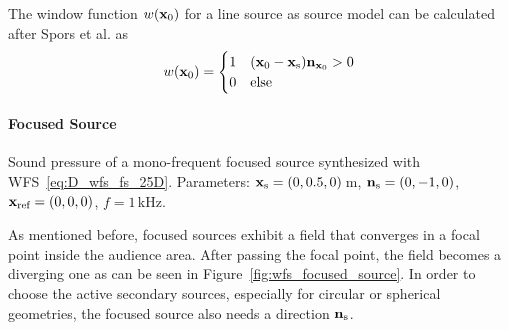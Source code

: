 %
The window function $w(\mathbf{x}_0)$ for a line source as source model can be
calculated after Spors et al. as\autocite{Spors2008}
%
\begin{equation}
    w(\x_0) = 
    \begin{cases}
        1 & (\x_0-\xs) \n_{\x_0} > 0 \\
        0 & \text{else}
    \end{cases}
    \label{eq:w_ls}
\end{equation}
%



\paragraph{Focused Source}
%
%
\begin{marginfigure}
    \centering
    \ft
    
    \caption{Sound pressure of a mono-frequent focused source synthesized with
        \twohalfD \ac{WFS}~\eqref{eq:D_wfs_fs_25D}. Parameters: $\mathbf{x}_\text{s} = (0,0.5,0)$\,m,
        $\mathbf{n}_\text{s} = (0,-1,0)$, $\mathbf{x}_\text{ref} = (0,0,0)$, $f = 1$\,kHz.
        }
    \label{fig:wfs_focused_source}
\end{marginfigure}
%
As mentioned before, focused sources exhibit a field that converges in a focal
point inside the audience area. After passing the focal
point, the field becomes a diverging one as can be seen in
Figure~\ref{fig:wfs_focused_source}. In order to choose the active secondary
sources, especially for circular or spherical geometries, the focused source
also needs a direction $\mathbf{n}_\text{s}$.

